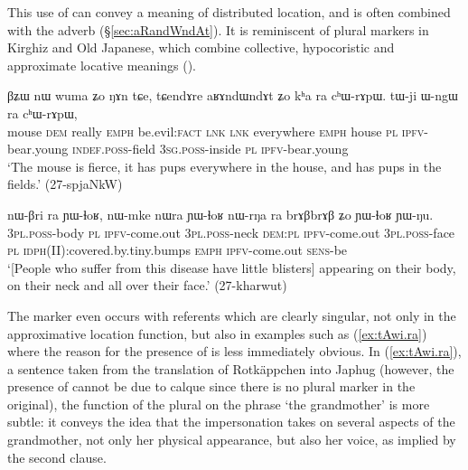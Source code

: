 This use of  can convey a meaning of distributed location, and is often combined with the adverb  (§\ref{sec:aRandWndAt}). It is reminiscent of plural markers in Kirghiz and Old Japanese, which combine collective, hypocoristic and approximate locative meanings (\citealt[195]{antonov07ra}).

\begin{exe}
\ex \label{ex:kha.ra}
\gll βʑɯ nɯ wuma ʑo ŋɤn tɕe, tɕendɤre aʁɤndɯndɤt ʑo kʰa ra cʰɯ-rɤpɯ. tɯ-ji ɯ-ngɯ ra cʰɯ-rɤpɯ, \\
mouse \textsc{dem} really \textsc{emph} be.evil:\textsc{fact} \textsc{lnk} \textsc{lnk} everywhere \textsc{emph} house \textsc{pl} \textsc{ipfv}-bear.young \textsc{indef}.\textsc{poss}-field \textsc{3sg}.\textsc{poss}-inside \textsc{pl}  \textsc{ipfv}-bear.young \\
\glt `The mouse is fierce, it has pups everywhere in the house, and has pups in the fields.' (27-spjaNkW)
\end{exe} 

\begin{exe}
\ex \label{ex:nWrNa.ra}
\gll nɯ-βri ra ɲɯ-ɬoʁ, nɯ-mke nɯra ɲɯ-ɬoʁ nɯ-rŋa ra brɤβbrɤβ ʑo ɲɯ-ɬoʁ ɲɯ-ŋu. \\
\textsc{3pl}.\textsc{poss}-body \textsc{pl} \textsc{ipfv}-come.out \textsc{3pl}.\textsc{poss}-neck \textsc{dem}:\textsc{pl} \textsc{ipfv}-come.out \textsc{3pl}.\textsc{poss}-face \textsc{pl} \textsc{idph}(II):covered.by.tiny.bumps \textsc{emph} \textsc{ipfv}-come.out  \textsc{sens}-be \\
\glt `[People who suffer from this disease have little blisters] appearing on their body, on their neck and all over their face.' (27-kharwut)
\end{exe} 

The marker  even occurs with referents which are clearly singular, not only in the approximative location function, but also in examples such as (\ref{ex:tAwi.ra}) where the reason for the presence of  is less immediately obvious. In (\ref{ex:tAwi.ra}), a sentence taken from the translation of Rotkäppchen into Japhug (however, the presence of  cannot be due to calque since there is no plural marker in the original), the function of the plural on the phrase  `the grandmother' is more subtle: it conveys the idea that the impersonation takes on several aspects of the grandmother, not only her physical appearance, but also her voice, as implied by the second clause. 

